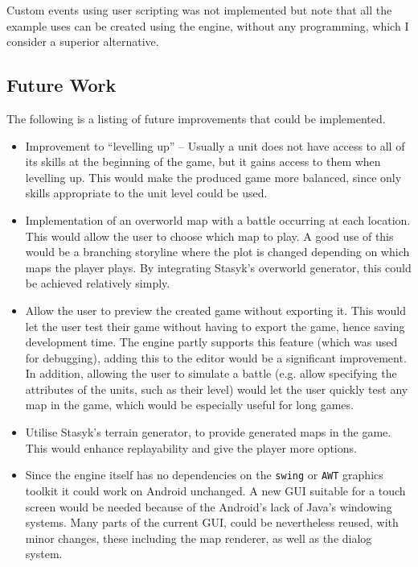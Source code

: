 Custom events using user scripting was not implemented but note that all the example uses can be created using the engine, without any programming, which I consider a superior alternative. 

\subsection{Future Work}

The following is a listing of future improvements that could be implemented. 

\begin{itemize}
\item Improvement to ``levelling up'' -- Usually a unit does not have access to all of its skills at the beginning of the game, but it gains access to them when levelling up.  This would make the produced game  more balanced, since only skills appropriate to the unit level could be used.

\item Implementation of an overworld map with a battle occurring at each location. This would allow the user to choose which map to play.  A good use of this would be a branching storyline where the plot is changed depending on which maps the player plays. By integrating Stasyk's overworld generator, this could be achieved relatively simply.
 
\item  Allow the user to preview the created game without exporting it.  This would let the user test their game without having to export the game, hence saving development time.  The engine partly supports this feature (which was used for debugging), adding this to the editor would be a significant improvement. In addition, allowing the user to simulate a battle (e.g. allow specifying the attributes of the units, such as their level)  would let the user quickly test any map in the game, which would be especially useful for long games.

\item Utilise Stasyk's terrain generator, to provide generated maps in the game. This would enhance replayability and give the player more options. 

\item Since the engine itself has no dependencies on the \texttt{swing} or \texttt{AWT} graphics toolkit it could work on Android unchanged. A new GUI suitable for a touch screen would be needed because of the Android's lack of Java's windowing systems. Many parts of the current GUI, could be nevertheless reused, with minor changes, these including the map renderer, as well as the dialog system. 


\end{itemize}

